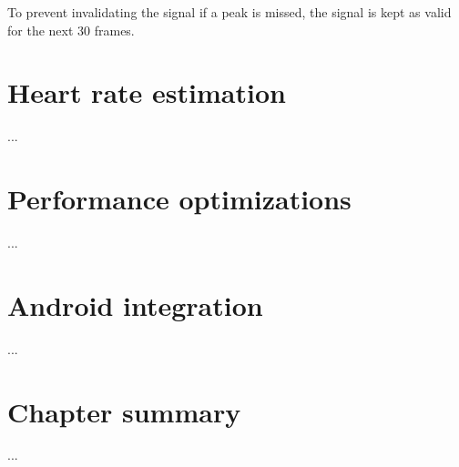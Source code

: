To prevent invalidating the signal if a peak is missed, the signal is kept
as valid for the next 30 frames.

\section{Heart rate estimation} \label{sec:impl:estimation}

...

\section{Performance optimizations} \label{sec:impl:performance}

...

\section{Android integration} \label{sec:impl:android}


...

\section{Chapter summary}

...
